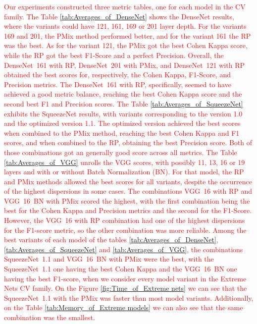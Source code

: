 \textcolor{red}{
Our experiments constructed three metric tables, one for each model in the \gls{CV} family.
The Table \ref{tab:Averages_of_DenseNet} shows the DenseNet results, where the variants could have 121, 161, 169 or 201 layer depth. For the variants 169 and 201, the \gls{PMix} method performed better, and for the variant 161 the \gls{RP} was the best. As for the variant 121, the \gls{PMix} got the best Cohen Kappa score, while the \gls{RP} got the best F1-Score and a perfect Precision. Overall, the \mbox{DenseNet 161} with \gls{RP}, \mbox{DenseNet 201} with \gls{PMix}, and \mbox{DenseNet 121} with \gls{RP} obtained the best scores for, respectively, the Cohen Kappa, F1-Score, and Precision metrics. The \mbox{DenseNet 161} with \gls{RP}, specifically, seemed to have achieved a good metric balance, reaching the best Cohen Kappa score and the second best F1 and Precision scores.    
The Table \ref{tab:Averages_of_SqueezeNet} exhibits the SqueezeNet results, with variants corresponding to the version 1.0 and the optimized version 1.1. The optimized version achieved the best scores when combined to the \gls{PMix} method, reaching the best Cohen Kappa and F1 scores, and when combined to the \gls{RP}, obtaining the best Precision score. Both of those combinations got an generally good score across all metrics. 
The Table \ref{tab:Averages_of_VGG} unrolls the VGG scores, with possibly 11, 13, 16 or 19 layers and with or without Batch Normalization (BN). For that model, the \gls{RP} and \gls{PMix} methods allowed the best scores for all variants, despite the occurrence of the highest dispersions in some cases. The combinations \mbox{VGG 16} with \gls{RP} and \mbox{VGG 16 BN} with \gls{PMix} scored the highest, with the first combination being the best for the Cohen Kappa and Precision metrics and the second for the F1-Score. However, the \mbox{VGG 16} with \gls{RP} combination had one of the highest dispersions for the F1-score metric, so the other combination was more reliable.   
Among the best variants of each model of the tables \ref{tab:Averages_of_DenseNet}, \ref{tab:Averages_of_SqueezeNet} and \ref{tab:Averages_of_VGG}, the combinations \mbox{SqueezeNet 1.1} and \mbox{VGG 16 BN} with \gls{PMix} were the best, with the \mbox{SqueezeNet 1.1} one having the best Cohen Kappa and the \mbox{VGG 16 BN} one having the best F1-score, when we consider every model variant in the Extreme Nets \gls{CV} family. On the Figure \ref{fig:Time_of_Extreme nets} we can see that the \mbox{SqueezeNet 1.1} with the \gls{PMix} was faster than most model variants. Additionally, on the Table \ref{tab:Memory_of_Extreme models} we can also see that the same combination was the smallest.
}

